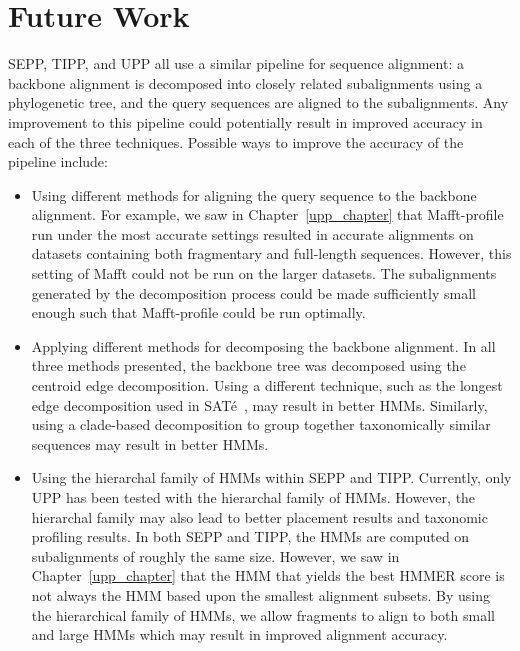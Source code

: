 \section{Future Work}
SEPP, TIPP, and UPP all use a similar pipeline for sequence alignment: a backbone alignment is decomposed into closely related subalignments using a phylogenetic tree, and the query sequences are aligned to the subalignments.  Any improvement to this pipeline could potentially result in improved accuracy in each of the three techniques.  Possible ways to improve the accuracy of the pipeline include:
  
\begin{itemize}
\item Using different methods for aligning the query sequence to the backbone alignment.  For example, we saw in Chapter~\ref{upp_chapter} that Mafft-profile run under the most accurate settings resulted in accurate alignments on datasets containing both fragmentary and full-length sequences.  However, this setting of Mafft could not be run on the larger datasets.  The subalignments generated by the decomposition process could be made sufficiently small enough such that Mafft-profile could be run optimally.
\item Applying different methods for decomposing the backbone alignment.  In all three methods presented, the backbone tree was decomposed using the centroid edge decomposition.  Using a different technique, such as the longest edge decomposition used in SAT\'{e}~\cite{Liu2009}, may result in better HMMs.  Similarly, using a clade-based decomposition to group together taxonomically similar sequences may result in better HMMs.
\item Using the hierarchal family of HMMs within SEPP and TIPP.  Currently, only UPP has been tested with the hierarchal family of HMMs.  However, the hierarchal family may also lead to better placement results and taxonomic profiling results.  In both SEPP and TIPP, the HMMs are computed on subalignments of roughly the same size.  However, we saw in Chapter~\ref{upp_chapter} that the HMM that yields the best HMMER score is not always the HMM based upon the smallest alignment subsets.  By using the hierarchical family of HMMs, we allow fragments to align to both small and large HMMs which may result in improved alignment accuracy.

\end{itemize}

